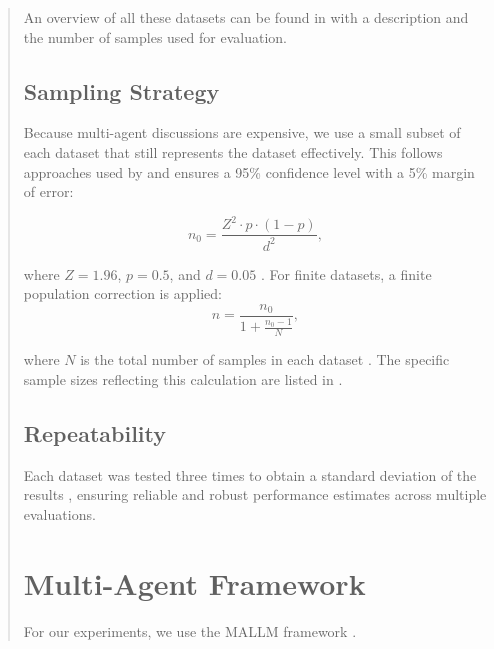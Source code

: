 \documentclass[11pt]{article}
\begin{document}
\begin{abstract}
An overview of all these datasets can be found in  with a description and the number of samples used for evaluation.


\subsection{Sampling Strategy}
Because multi-agent discussions are expensive, we use a small subset of each dataset that still represents the dataset effectively. This follows approaches used by \citet{yin_exchange--thought_2023, chen_reconcile_2024, becker_multi-agent_2024} and ensures a 95\% confidence level with a 5\% margin of error:

\[
n_0 = \frac{Z^2 \cdot p \cdot (1 - p)}{d^2},
\]

where \(Z = 1.96\), \(p = 0.5\), and \(d = 0.05\) \citep{thompson_sampling_2012}. For finite datasets, a finite population correction is applied:
\[
n = \frac{n_0}{1 + \frac{n_0 - 1}{N}},
\]

where \(N\) is the total number of samples in each dataset \citep{cochran_sampling_1953}. The specific sample sizes reflecting this calculation are listed in .

\subsection{Repeatability}
Each dataset was tested three times to obtain a standard deviation of the results \citep{reimers_reporting_2017, chen_reconcile_2024, becker_multi-agent_2024}, ensuring reliable and robust performance estimates across multiple evaluations.



\section{Multi-Agent Framework}
\label{sec:mallm}
For our experiments, we use the \ac{MALLM} framework \citep{becker2025mallmmultiagentlargelanguage}.


\end{abstract}
\end{document}
